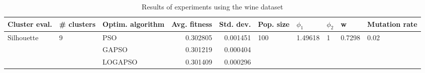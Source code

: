 \begin{table}
\centering
\caption{Results of experiments using the wine dataset}
\begin{tabular}{lllrrlllll}
\toprule
              Cluster eval. &        \# clusters & Optim. algorithm &  Avg. fitness &  Std. dev. &            Pop. size &               $\phi_{1}$ &         $\phi_{2}$ &                       w &         Mutation rate \\
\midrule
\multirow{3}{*}{Silhouette} & \multirow{3}{*}{9} &              PSO &      0.302805 &   0.001451 & \multirow{3}{*}{100} & \multirow{3}{*}{1.49618} & \multirow{3}{*}{1} & \multirow{3}{*}{0.7298} & \multirow{3}{*}{0.02} \\
                            &                    &            GAPSO &      0.301219 &   0.000404 &                      &                          &                    &                         &                       \\
                            &                    &          LOGAPSO &      0.301409 &   0.000296 &                      &                          &                    &                         &                       \\
\bottomrule
\end{tabular}
\end{table}
